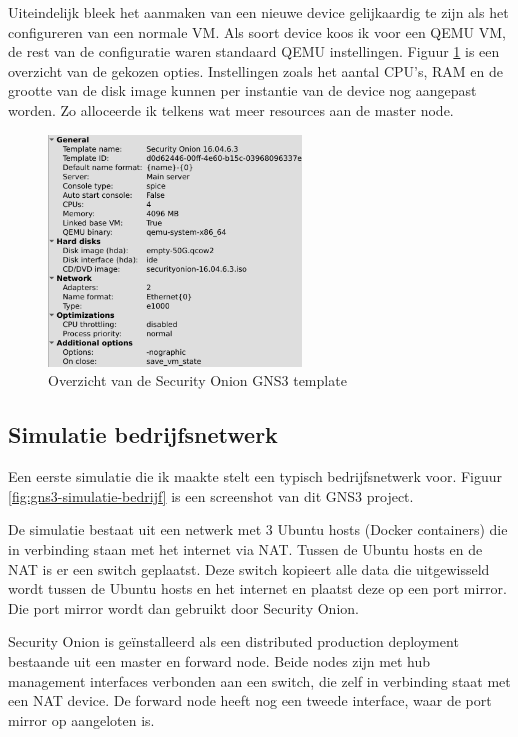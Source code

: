 \documentclass[a4paper,12pt]{report}
\begin{document}
Uiteindelijk bleek het aanmaken van een nieuwe device gelijkaardig te zijn als het configureren van een normale VM.
Als soort device koos ik voor een QEMU VM, de rest van de configuratie waren standaard QEMU instellingen.
Figuur \ref{fig:gns3-so-appliance} is een overzicht van de gekozen opties.
Instellingen zoals het aantal CPU's, RAM en de grootte van de disk image kunnen per instantie van de device nog aangepast worden.
Zo alloceerde ik telkens wat meer resources aan de master node.

\begin{figure}[H]
  \centering
  \includegraphics[width=0.6\textwidth]{gns3-so-appliance}
  \caption{Overzicht van de Security Onion GNS3 template}
  \label{fig:gns3-so-appliance}
\end{figure}

\subsection{Simulatie bedrijfsnetwerk}

Een eerste simulatie die ik maakte stelt een typisch bedrijfsnetwerk voor.
Figuur \ref{fig:gns3-simulatie-bedrijf} is een screenshot van dit GNS3 project.

De simulatie bestaat uit een netwerk met 3 Ubuntu hosts (Docker containers) die in verbinding staan met het internet via NAT.
Tussen de Ubuntu hosts en de NAT is er een switch geplaatst.
Deze switch kopieert alle data die uitgewisseld wordt tussen de Ubuntu hosts en het internet en plaatst deze op een port mirror.
Die port mirror wordt dan gebruikt door Security Onion.

Security Onion is geïnstalleerd als een distributed production deployment bestaande uit een master en forward node. 
Beide nodes zijn met hub management interfaces verbonden aan een switch, die zelf in verbinding staat met een NAT device.
De forward node heeft nog een tweede interface, waar de port mirror op aangeloten is.
\end{document}
